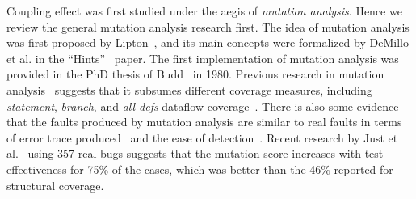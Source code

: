 \documentclass[preprint,nonatbib]{sigplanconf}\usepackage[]{graphicx}\usepackage[]{color}
\begin{document}
Coupling effect was first studied under the aegis of \emph{mutation analysis}.
Hence we review the general mutation analysis research first.
The idea of mutation analysis was first proposed by 
Lipton~\cite{lipton1971fault}, and its main concepts were formalized by
DeMillo et al. in the ``Hints''~\cite{demillo1978hints} paper. The first
implementation of mutation analysis was provided in the PhD thesis of
Budd~\cite{budd1980theoretical} in 1980.
Previous research in mutation
analysis~\cite{budd1980mutation,mathur1994empirical,offutt1996subsumption}
suggests that it subsumes different coverage measures, including
\textit{statement}, \textit{branch}, and \textit{all-defs} dataflow
coverage~\cite{budd1980mutation,mathur1994empirical,offutt1996subsumption}.
There is also some evidence that the faults produced
by mutation analysis are similar to real faults in terms of
error trace produced~\cite{daran1996software} and the ease of
detection~\cite{andrews2005mutation,andrews2006using}.  Recent research by
Just et al.~\cite{just2014mutants} using 357 real bugs suggests that the
mutation score increases with test effectiveness for 75\% of the cases,
which was better than the 46\% reported for structural coverage.
\end{document}
